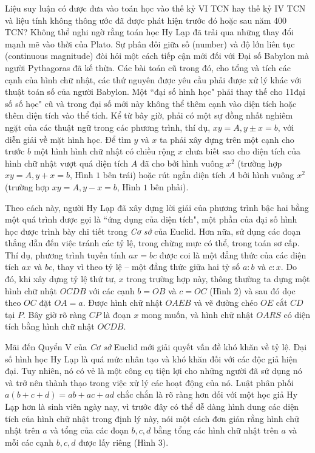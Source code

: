 \begin{multicols}{2}
	\vskip 0.1cm
	Liệu suy luận có được đưa vào toán học vào thế kỷ VI TCN hay thế kỷ IV TCN và liệu tính không thông ước đã được phát hiện trước đó hoặc sau năm $400$ TCN? Không thể nghi ngờ rằng toán học Hy Lạp đã trải qua những thay đổi mạnh mẽ vào thời của Plato. Sự phân đôi giữa số (number) và độ lớn liên tục (continuous magnitude) đòi hỏi một cách tiếp cận mới đối với Đại số Babylon mà người Pythagoras đã kế thừa.
	\vskip 0.1cm
	Các bài toán cũ trong đó, cho tổng và tích các cạnh của hình chữ nhật, các thứ nguyên được yêu cầu phải được xử lý khác với thuật toán số của người Babylon. 
	\vskip 0.1cm
	Một ``đại số hình học" phải thay thế cho 11đại số số học" cũ và trong đại số mới này không thể  thêm cạnh vào diện tích hoặc thêm diện tích vào thể tích.
	\vskip 0.1cm
	Kể từ bây giờ, phải có một sự đồng nhất nghiêm ngặt của các thuật ngữ trong các phương trình, thí dụ, $xy = A, y \pm x = b$, với diễn giải về mặt hình học. Để tìm $y$ và $x$  ta phải xây dựng trên một cạnh cho trước $b$  một hình hình chữ nhật có chiều rộng $x$  chưa biết sao cho diện tích của hình chữ nhật vượt quá diện tích $A$  đã cho bởi hình vuông  $x^2$ (trường hợp $xy = A, y + x = b$, Hình $1$ bên trái) hoặc rút ngắn diện tích  $A$ bởi hình vuông  $x^2$ (trường hợp $xy = A, y - x = b$,  Hình $1$ bên phải). 

	Theo cách này, người Hy Lạp đã xây dựng lời giải của phương trình bậc hai bằng một quá trình được gọi là ``ứng dụng của diện tích", một phần của đại số hình học được trình bày chi tiết trong \textit{Cơ sở} của Euclid. 
	\vskip 0.1cm
	Hơn nữa, sử dụng các đoạn thẳng dẫn đến việc tránh các tỷ lệ, trong chừng mực có thể, trong toán sơ cấp. Thí dụ, phương trình tuyến tính $ax = bc$ được coi là một đẳng thức của các diện tích $ax$  và $bc$,  thay vì theo tỷ lệ -- một đẳng thức giữa hai tỷ số $a : b$  và $c : x$. Do đó, khi xây dựng tỷ lệ thứ tư, $x$  trong trường hợp này, thông thường ta dựng một hình chữ nhật $OCDB$  với các cạnh $b = OB$  và  $c = OC$ (Hình $2$) và sau đó dọc theo $OC$  đặt $OA = a$.  Được hình chữ nhật $OAEB$ và vẽ đường chéo $OE$  cắt  $CD$ tại $P$.  Bây giờ rõ ràng  $CP$ là đoạn  $x$ mong muốn, và hình chữ nhật  $OARS$ có diện tích bằng hình chữ nhật $OCDB$. 
	
	Mãi đến Quyển V của \textit{Cơ sở} Euclid mới giải quyết vấn đề khó khăn về tỷ lệ.
	\vskip 0.1cm
	Đại số hình học Hy Lạp là quá mức nhân tạo và khó khăn đối với các độc giả hiện đại. Tuy nhiên, nó có vẻ là một công cụ tiện lợi cho những người đã sử dụng nó và trở nên thành thạo trong việc xử lý các hoạt động của nó.
	\vskip 0.1cm
	Luật phân phối $a(b + c + d) = ab + ac + ad$  chắc chắn là rõ ràng hơn đối với một học giả Hy Lạp hơn là sinh viên ngày nay, vì trước đây có thể dễ dàng hình dung các diện tích của hình chữ nhật trong định lý này, nói một cách đơn giản rằng hình chữ nhật trên $a$ và tổng của các đoạn $b,c,d$  bằng tổng các hình chữ nhật trên $a$  và mỗi các cạnh $b,c,d$  được lấy riêng (Hình $3$). 
	

\end{multicols}
